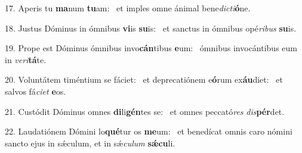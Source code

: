 17. Aperis tu \textbf{ma}num \textbf{tu}am: \ast\  et imples omne ánimal bene\textit{dic}\textit{ti}\textbf{ó}ne.\

18. Justus Dóminus in ómnibus \textbf{vi}is \textbf{su}is: \ast\  et sanctus in ómnibus opé\textit{ri}\textit{bus} \textbf{su}is.\

19. Prope est Dóminus ómnibus invo\textbf{cán}tibus \textbf{e}um: \ast\  ómnibus invocántibus eum in \textit{ve}\textit{ri}\textbf{tá}te.\

20. Voluntátem timéntium se fáciet: \dag\  et deprecatiónem e\textbf{ó}rum ex\textbf{áu}diet: \ast\  et salvos fá\textit{ci}\textit{et} \textbf{e}os.\

21. Custódit Dóminus omnes \textbf{di}li\textbf{gén}tes se: \ast\  et omnes peccató\textit{res} \textit{dis}\textbf{pér}det.\

22. Laudatiónem Dómini lo\textbf{qué}tur os \textbf{me}um: \ast\  et benedícat omnis caro nómini sancto ejus in sǽculum, et in sǽ\textit{cu}\textit{lum} \textbf{sǽ}\textbf{cu}li.\

